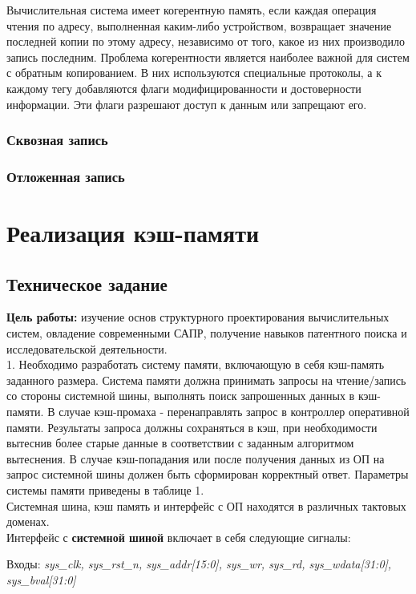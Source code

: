 \documentclass[13pt]{article}
\begin{document}
Вычислительная система имеет когерентную память, если каждая операция чтения по адресу, выполненная каким-либо устройством, возвращает значение последней копии по этому адресу, независимо от того, какое из них производило запись последним. Проблема когерентности является наиболее важной для систем с обратным копированием. В них используются специальные протоколы, а к каждому тегу добавляются флаги модифицированности и достоверности информации. Эти флаги разрешают доступ к данным или запрещают его.
	\subsubsection{Сквозная запись}
	\subsubsection{Отложенная запись}
	\newpage
	\section{Реализация кэш-памяти}
	\subsection{Техническое задание}
	\textbf{Цель работы:} изучение основ структурного проектирования вычислительных систем, овладение современными САПР, получение навыков патентного поиска и исследовательской деятельности.\\
	
	1. Необходимо разработать систему памяти, включающую в себя кэш-память заданного размера. Система памяти должна принимать запросы на чтение/запись со стороны системной шины, выполнять поиск запрошенных данных в кэш-памяти. В случае кэш-промаха - перенаправлять запрос в контроллер оперативной памяти. Результаты запроса должны сохраняться в кэш, при необходимости вытеснив более старые данные в соответствии с заданным алгоритмом вытеснения. В случае кэш-попадания или после получения данных из ОП на запрос системной шины должен быть сформирован корректный ответ. Параметры системы памяти приведены в таблице 1.\\
	Системная шина, кэш память и интерфейс с ОП находятся в различных тактовых доменах.\\
	Интерфейс с \textbf{системной шиной} включает в себя следующие сигналы:
	
	\hspace{5mm}Входы: \textit{sys\_clk, sys\_rst\_n, sys\_addr[15:0], sys\_wr, sys\_rd, sys\_wdata[31:0], sys\_bval[31:0]}
	
\end{document}
